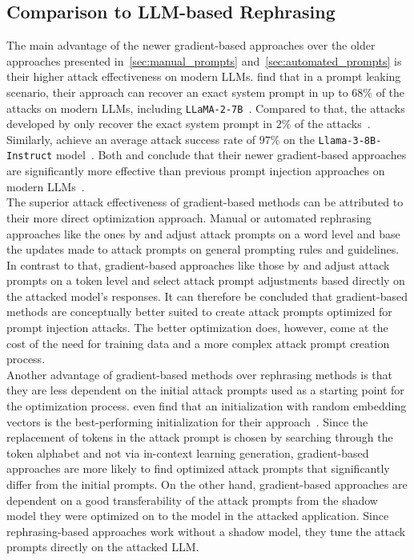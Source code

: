 \subsection{Comparison to LLM-based Rephrasing}
The main advantage of the newer gradient-based approaches over the older approaches presented in~\cref{sec:manual_prompts} and~\cref{sec:automated_prompts} is their higher attack effectiveness on modern LLMs.
\hui find that in a prompt leaking scenario, their approach can recover an exact system prompt in up to $68\%$ of the attacks on modern LLMs, including \texttt{LLaMA-2-7B}~\cite{hui_pleak_2024}.
Compared to that, the attacks developed by \perez only recover the exact system prompt in $2\%$ of the attacks~\cite{hui_pleak_2024}.
Similarly, \shi achieve an average attack success rate of $97\%$ on the \texttt{Llama-3-8B-Instruct} model~\cite{shi_optimization-based_2024}.
Both \hui and \shi conclude that their newer gradient-based approaches are significantly more effective than previous prompt injection approaches on modern LLMs~\cite{hui_pleak_2024, shi_optimization-based_2024}.\\

The superior attack effectiveness of gradient-based methods can be attributed to their more direct optimization approach.
Manual or automated rephrasing approaches like the ones by \perez and \deng adjust attack prompts on a word level and base the updates made to attack prompts on general prompting rules and guidelines.
In contrast to that, gradient-based approaches like those by \hui and \shi adjust attack prompts on a token level and select attack prompt adjustments based directly on the attacked model's responses.
It can therefore be concluded that gradient-based methods are conceptually better suited to create attack prompts optimized for prompt injection attacks.
The better optimization does, however, come at the cost of the need for training data and a more complex attack prompt creation process.\\

Another advantage of gradient-based methods over rephrasing methods is that they are less dependent on the initial attack prompts used as a starting point for the optimization process.
\hui even find that an initialization with random embedding vectors is the best-performing initialization for their approach~\cite{hui_pleak_2024}.
Since the replacement of tokens in the attack prompt is chosen by searching through the token alphabet and not via in-context learning generation, gradient-based approaches are more likely to find optimized attack prompts that significantly differ from the initial prompts.
On the other hand, gradient-based approaches are dependent on a good transferability of the attack prompts from the shadow model they were optimized on to the model in the attacked application.
Since rephrasing-based approaches work without a shadow model, they tune the attack prompts directly on the attacked LLM.\\

